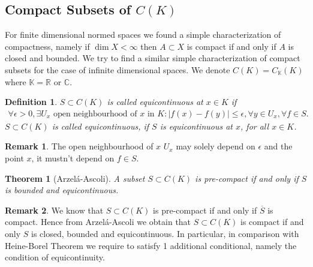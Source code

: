 \documentclass[11pt,a4paper]{article}
\newtheorem{thm}{Theorem}[section]
\newtheorem{defn}{Definition}[section]
\theoremstyle{definition}
\newtheorem{rem}{Remark}[section]
\begin{document}
\subsection{Compact Subsets of $C(K)$}
For finite dimensional normed spaces we found a simple characterization of compactness, namely if $\dim X < \infty$ then $A \subset X$ is compact if and only if $A$ is closed and bounded. We try to find a similar simple characterization of compact subsets for the case of infinite dimensional spaces. We denote $C(K)=C_\mathbb{K}(K)$ where $\mathbb{K}= \mathbb{R}$ or $\mathbb{C}$. 
\begin{defn} $S \subset C(K)$ is called equicontinuous at $x \in K$ if 
\begin{align*}
\forall \epsilon >0, \exists U_x \text{ open neighbourhood of $x$ in $K$} : |f(x)-f(y)| \leq \epsilon, \forall y \in U_x, \forall f \in S. 
\end{align*}
$S \subset C(K)$ is called equicontinuous, if $S$ is equicontinuous at $x$, for all $x \in K$. 
\end{defn}
\begin{rem} The open neighbourhood of $x$ $U_x$ may solely depend on $\epsilon$ and the point $x$, it mustn't depend on $f \in S$. 
\end{rem}
\begin{thm}[Arzelá-Ascoli] A subset $S \subset C(K)$ is pre-compact if and only if $S$ is bounded and equicontinuous. 
\end{thm}
\begin{rem} We know that $S \subset C(K)$ is pre-compact if and only if $\overline{S}$ is compact. Hence from Arzelá-Ascoli we obtain that $S \subset C(K)$ is compact if and only $S$ is closed, bounded and equicontinuous. In particular, in comparison with Heine-Borel Theorem we require to satisfy 1 additional conditional, namely the condition of equicontinuity. 
\end{rem}
\end{document}

